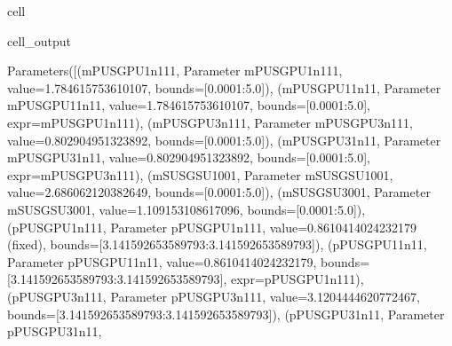 \documentclass[letterpaper,table,10pt,english]{jupyterBook}
\begin{document}
\begin{sphinxuseclass}{cell}
\begin{sphinxVerbatimOutput}
\begin{sphinxuseclass}{cell_output}
\begin{sphinxVerbatim}[commandchars=\\\{\}]
Parameters([(\PYGZsq{}m\PYGZus{}PU\PYGZus{}SG\PYGZus{}PU\PYGZus{}1\PYGZus{}n1\PYGZus{}1\PYGZus{}1\PYGZsq{}, \PYGZlt{}Parameter \PYGZsq{}m\PYGZus{}PU\PYGZus{}SG\PYGZus{}PU\PYGZus{}1\PYGZus{}n1\PYGZus{}1\PYGZus{}1\PYGZsq{}, value=1.784615753610107, bounds=[0.0001:5.0]\PYGZgt{}), (\PYGZsq{}m\PYGZus{}PU\PYGZus{}SG\PYGZus{}PU\PYGZus{}1\PYGZus{}1\PYGZus{}n1\PYGZus{}1\PYGZsq{}, \PYGZlt{}Parameter \PYGZsq{}m\PYGZus{}PU\PYGZus{}SG\PYGZus{}PU\PYGZus{}1\PYGZus{}1\PYGZus{}n1\PYGZus{}1\PYGZsq{}, value=1.784615753610107, bounds=[0.0001:5.0], expr=\PYGZsq{}m\PYGZus{}PU\PYGZus{}SG\PYGZus{}PU\PYGZus{}1\PYGZus{}n1\PYGZus{}1\PYGZus{}1\PYGZsq{}\PYGZgt{}), (\PYGZsq{}m\PYGZus{}PU\PYGZus{}SG\PYGZus{}PU\PYGZus{}3\PYGZus{}n1\PYGZus{}1\PYGZus{}1\PYGZsq{}, \PYGZlt{}Parameter \PYGZsq{}m\PYGZus{}PU\PYGZus{}SG\PYGZus{}PU\PYGZus{}3\PYGZus{}n1\PYGZus{}1\PYGZus{}1\PYGZsq{}, value=0.802904951323892, bounds=[0.0001:5.0]\PYGZgt{}), (\PYGZsq{}m\PYGZus{}PU\PYGZus{}SG\PYGZus{}PU\PYGZus{}3\PYGZus{}1\PYGZus{}n1\PYGZus{}1\PYGZsq{}, \PYGZlt{}Parameter \PYGZsq{}m\PYGZus{}PU\PYGZus{}SG\PYGZus{}PU\PYGZus{}3\PYGZus{}1\PYGZus{}n1\PYGZus{}1\PYGZsq{}, value=0.802904951323892, bounds=[0.0001:5.0], expr=\PYGZsq{}m\PYGZus{}PU\PYGZus{}SG\PYGZus{}PU\PYGZus{}3\PYGZus{}n1\PYGZus{}1\PYGZus{}1\PYGZsq{}\PYGZgt{}), (\PYGZsq{}m\PYGZus{}SU\PYGZus{}SG\PYGZus{}SU\PYGZus{}1\PYGZus{}0\PYGZus{}0\PYGZus{}1\PYGZsq{}, \PYGZlt{}Parameter \PYGZsq{}m\PYGZus{}SU\PYGZus{}SG\PYGZus{}SU\PYGZus{}1\PYGZus{}0\PYGZus{}0\PYGZus{}1\PYGZsq{}, value=2.686062120382649, bounds=[0.0001:5.0]\PYGZgt{}), (\PYGZsq{}m\PYGZus{}SU\PYGZus{}SG\PYGZus{}SU\PYGZus{}3\PYGZus{}0\PYGZus{}0\PYGZus{}1\PYGZsq{}, \PYGZlt{}Parameter \PYGZsq{}m\PYGZus{}SU\PYGZus{}SG\PYGZus{}SU\PYGZus{}3\PYGZus{}0\PYGZus{}0\PYGZus{}1\PYGZsq{}, value=1.109153108617096, bounds=[0.0001:5.0]\PYGZgt{}), (\PYGZsq{}p\PYGZus{}PU\PYGZus{}SG\PYGZus{}PU\PYGZus{}1\PYGZus{}n1\PYGZus{}1\PYGZus{}1\PYGZsq{}, \PYGZlt{}Parameter \PYGZsq{}p\PYGZus{}PU\PYGZus{}SG\PYGZus{}PU\PYGZus{}1\PYGZus{}n1\PYGZus{}1\PYGZus{}1\PYGZsq{}, value=\PYGZhy{}0.8610414024232179 (fixed), bounds=[\PYGZhy{}3.141592653589793:3.141592653589793]\PYGZgt{}), (\PYGZsq{}p\PYGZus{}PU\PYGZus{}SG\PYGZus{}PU\PYGZus{}1\PYGZus{}1\PYGZus{}n1\PYGZus{}1\PYGZsq{}, \PYGZlt{}Parameter \PYGZsq{}p\PYGZus{}PU\PYGZus{}SG\PYGZus{}PU\PYGZus{}1\PYGZus{}1\PYGZus{}n1\PYGZus{}1\PYGZsq{}, value=\PYGZhy{}0.8610414024232179, bounds=[\PYGZhy{}3.141592653589793:3.141592653589793], expr=\PYGZsq{}p\PYGZus{}PU\PYGZus{}SG\PYGZus{}PU\PYGZus{}1\PYGZus{}n1\PYGZus{}1\PYGZus{}1\PYGZsq{}\PYGZgt{}), (\PYGZsq{}p\PYGZus{}PU\PYGZus{}SG\PYGZus{}PU\PYGZus{}3\PYGZus{}n1\PYGZus{}1\PYGZus{}1\PYGZsq{}, \PYGZlt{}Parameter \PYGZsq{}p\PYGZus{}PU\PYGZus{}SG\PYGZus{}PU\PYGZus{}3\PYGZus{}n1\PYGZus{}1\PYGZus{}1\PYGZsq{}, value=\PYGZhy{}3.1204444620772467, bounds=[\PYGZhy{}3.141592653589793:3.141592653589793]\PYGZgt{}), (\PYGZsq{}p\PYGZus{}PU\PYGZus{}SG\PYGZus{}PU\PYGZus{}3\PYGZus{}1\PYGZus{}n1\PYGZus{}1\PYGZsq{}, \PYGZlt{}Parameter \PYGZsq{}p\PYGZus{}PU\PYGZus{}SG\PYGZus{}PU\PYGZus{}3\PYGZus{}1\PYGZus{}n1\PYGZus{}1\PYGZsq{}, 
\end{sphinxVerbatim}
\end{sphinxuseclass}
\end{sphinxVerbatimOutput}
\end{sphinxuseclass}
\end{document}
